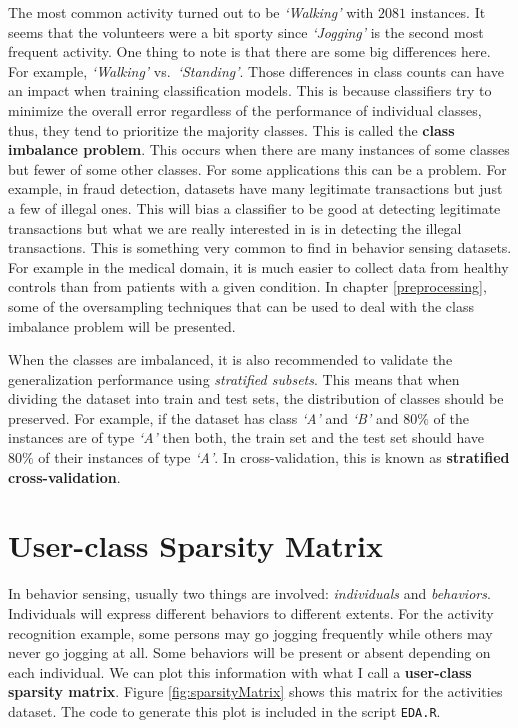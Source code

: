 \documentclass[
  11pt,
]{krantz}
\makeatletter
\newenvironment{kframe}{%
\medskip{}
\setlength{\fboxsep}{.8em}
 \def\at@end@of@kframe{}%
 \ifinner\ifhmode%
  \def\at@end@of@kframe{\end{minipage}}%
  \begin{minipage}{\columnwidth}%
 \fi\fi%
 \def\FrameCommand##1{\hskip\@totalleftmargin \hskip-\fboxsep
 \colorbox{shadecolor}{##1}\hskip-\fboxsep
     \hskip-\linewidth \hskip-\@totalleftmargin \hskip\columnwidth}%
 \MakeFramed {\advance\hsize-\width
   \@totalleftmargin\z@ \linewidth\hsize
   \@setminipage}}%
 {\par\unskip\endMakeFramed%
 \at@end@of@kframe}
\newenvironment{rmdblock}[1]
  {
  \begin{itemize}
  \renewcommand{\labelitemi}{
    \raisebox{-.7\height}[0pt][0pt]{
      {\setkeys{Gin}{width=3em,keepaspectratio}\texttt{[image: images/icons/\#1]}}
    }
  }
  \setlength{\fboxsep}{1em}
  \begin{kframe}
  \item
  }
  {
  \end{kframe}
  \end{itemize}
  }
\newenvironment{rmdgoodpractice}
  {\begin{rmdblock}{goodpractice}}
  {\end{rmdblock}}
\makeatother
\begin{document}
The most common activity turned out to be \emph{`Walking'} with \(2081\) instances. It seems that the volunteers were a bit sporty since \emph{`Jogging'} is the second most frequent activity. One thing to note is that there are some big differences here. For example, \emph{`Walking'} vs.~\emph{`Standing'}. Those differences in class counts can have an impact when training classification models. This is because classifiers try to minimize the overall error regardless of the performance of individual classes, thus, they tend to prioritize the majority classes. This is called the \textbf{class imbalance problem}. This occurs when there are many instances of some classes but fewer of some other classes. For some applications this can be a problem. For example, in fraud detection, datasets have many legitimate transactions but just a few of illegal ones. This will bias a classifier to be good at detecting legitimate transactions but what we are really interested in is in detecting the illegal transactions. This is something very common to find in behavior sensing datasets. For example in the medical domain, it is much easier to collect data from healthy controls than from patients with a given condition. In chapter \ref{preprocessing}, some of the oversampling techniques that can be used to deal with the class imbalance problem will be presented.

\begin{rmdgoodpractice}
When the classes are imbalanced, it is also recommended to validate the generalization performance using \emph{stratified subsets}. This means that when dividing the dataset into train and test sets, the distribution of classes should be preserved. For example, if the dataset has class \emph{`A'} and \emph{`B'} and \(80\%\) of the instances are of type \emph{`A'} then both, the train set and the test set should have \(80\%\) of their instances of type \emph{`A'}. In cross-validation, this is known as \textbf{stratified cross-validation}.
\end{rmdgoodpractice}

\hypertarget{user-class-sparsity-matrix}{%
\section{User-class Sparsity Matrix}\label{user-class-sparsity-matrix}}

In behavior sensing, usually two things are involved: \emph{individuals} and \emph{behaviors}. Individuals will express different behaviors to different extents. For the activity recognition example, some persons may go jogging frequently while others may never go jogging at all. Some behaviors will be present or absent depending on each individual. We can plot this information with what I call a \textbf{user-class sparsity matrix}. Figure \ref{fig:sparsityMatrix} shows this matrix for the activities dataset. The code to generate this plot is included in the script \texttt{EDA.R}.
\end{document}
